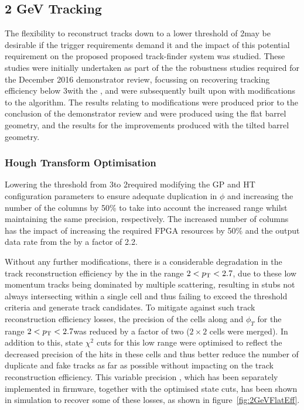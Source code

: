 \subsection{2 GeV Tracking}\label{subsec:Tmtt2GeV}
The flexibility to reconstruct tracks down to a lower \pT threshold of 2\GeV may be desirable if the trigger requirements demand it and the impact of this potential requirement on the proposed proposed track-finder system was studied.
These studies were initially undertaken as part of the the robustness studies required for the December 2016 demonstrator review, focussing on recovering tracking efficiency below 3\GeV with the \HT, and were subsequently built upon with modifications to the \KF algorithm. 
The results relating to \HT modifications were produced prior to the conclusion of the demonstrator review and were produced using the flat barrel geometry, and the results for the \KF improvements produced with the tilted barrel geometry.

\subsubsection{Hough Transform Optimisation}
Lowering the \HT \pT threshold from 3\GeV to 2\GeV required modifying the GP and HT configuration parameters to ensure adequate duplication in $\phi$ and increasing the number of the \qpt columns by 50\% to take into account the increased \pt range whilst maintaining the same precision, respectively.
The increased number of \qpt columns has the impact of increasing the required FPGA resources by 50\% and the output data rate from the \HT by a factor of 2.2.

Without any further modifications, there is a considerable degradation in the track reconstruction efficiency by the \HT in the range $2 < p_{\mathrm{T}} < 2.7$\GeVc, due to these low momentum tracks being dominated by multiple scattering, resulting in stubs not always intersecting within a single \HT cell and thus failing to exceed the threshold criteria and generate track candidates.
To mitigate against such track reconstruction efficiency losses, the precision of the \HT cells along \qpt and $\phi_{T}$ for the range $2 < p_{\mathrm{T}} < 2.7$\GeVc was reduced by a factor of two (\ie $2 \times 2$ cells were merged).
In addition to this, \KF state $\chi^2$ cuts for this low \pT range were optimised to reflect the decreased precision of the hits in these \HT cells and thus better reduce the number of duplicate and fake tracks as far as possible without impacting on the \HT track reconstruction efficiency.
This variable precision \HT, which has been separately implemented in firmware, together with the optimised \KF state cuts, has been shown in simulation to recover some of these losses, as shown in figure~\ref{fig:2GeVFlatEff}.

